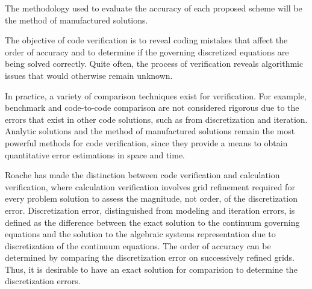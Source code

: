 The methodology used to evaluate the accuracy of each proposed
scheme will be the method of manufactured solutions.

The objective of code verification is to reveal coding mistakes that affect the order 
of accuracy and to determine if the governing discretized equations are being solved correctly.
Quite often, the process of verification reveals algorithmic issues that would otherwise remain 
unknown.

In practice, a variety of comparison techniques exist for verification. For example, 
benchmark and code-to-code comparison are not considered rigorous due to the errors
that exist in other code solutions, such as from discretization and iteration. Analytic 
solutions and the method of manufactured solutions remain the most powerful methods for 
code verification, since they provide a means to obtain quantitative error estimations in 
space and time.

Roache has made the distinction between 
code verification and calculation 
verification, where calculation verification involves grid refinement required for every 
problem solution to assess the magnitude, not order, of the discretization error. Discretization
error, distinguished from modeling and iteration errors, is defined as the difference between
the exact solution to the continuum governing equations and the solution to the algebraic 
systems representation due to discretization of the continuum equations. The order of accuracy
can be determined by comparing the discretization error on successively refined grids. Thus, it
is desirable to have an exact solution for comparision to determine the discretization errors.
